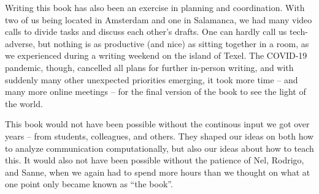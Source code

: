 Writing this book has also been an exercise in planning and coordination. With two of us being located in Amsterdam and one in
Salamanca, we had many video calls to divide tasks and discuss each other's drafts. One can hardly call us tech-adverse, but nothing
is as productive (and nice) as sitting together in a room, as we experienced during a writing weekend on the island of Texel.
The COVID-19 pandemic, though, cancelled all plans for further in-person writing, and with suddenly many other unexpected priorities emerging,
it took more time -- and many more online meetings -- for the final version of the book to see the light of the world.

This book would not have been possible without the continous input we got over years -- from students, colleagues, and others.
They shaped our ideas on both how to analyze communication computationally, but also our ideas about how to teach this. It
would also not have been possible without the patience of Nel, Rodrigo, and Sanne, when we again had to spend more hours than
we thought on what at one point only became known as ``the book''.


